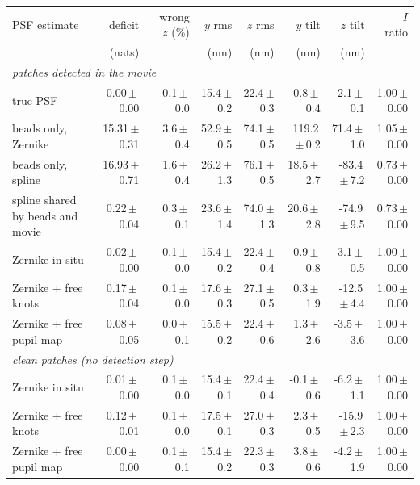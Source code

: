 \begin{tabular}{lrrrrrrr}\toprule
PSF estimate & deficit & wrong $z$ (\%) & $y$ rms & $z$ rms & $y$ tilt & $z$ tilt & $I$ ratio\\
 & (nats) & & (nm) & (nm) & (nm) & (nm) & \\ \midrule
\multicolumn{8}{l}{\emph{patches detected in the movie}}\\
true PSF & 0.00\,$\pm$\,0.00 & 0.1\,$\pm$\,0.0 & 15.4\,$\pm$\,0.2 & 22.4\,$\pm$\,0.3 & 0.8\,$\pm$\,0.4 & -2.1\,$\pm$\,0.1 & 1.00\,$\pm$\,0.00\\
beads only, Zernike & 15.31\,$\pm$\,0.31 & 3.6\,$\pm$\,0.4 & 52.9\,$\pm$\,0.5 & 74.1\,$\pm$\,0.5 & 119.2\,$\pm$\,0.2 & 71.4\,$\pm$\,1.0 & 1.05\,$\pm$\,0.00\\
beads only, spline & 16.93\,$\pm$\,0.71 & 1.6\,$\pm$\,0.4 & 26.2\,$\pm$\,1.3 & 76.1\,$\pm$\,0.5 & 18.5\,$\pm$\,2.7 & -83.4\,$\pm$\,7.2 & 0.73\,$\pm$\,0.00\\
spline shared by beads and movie & 0.22\,$\pm$\,0.04 & 0.3\,$\pm$\,0.1 & 23.6\,$\pm$\,1.4 & 74.0\,$\pm$\,1.3 & 20.6\,$\pm$\,2.8 & -74.9\,$\pm$\,9.5 & 0.73\,$\pm$\,0.00\\
Zernike in situ & 0.02\,$\pm$\,0.00 & 0.1\,$\pm$\,0.0 & 15.4\,$\pm$\,0.2 & 22.4\,$\pm$\,0.4 & -0.9\,$\pm$\,0.8 & -3.1\,$\pm$\,0.5 & 1.00\,$\pm$\,0.00\\
Zernike + free knots & 0.17\,$\pm$\,0.04 & 0.1\,$\pm$\,0.0 & 17.6\,$\pm$\,0.3 & 27.1\,$\pm$\,0.5 & 0.3\,$\pm$\,1.9 & -12.5\,$\pm$\,4.4 & 1.00\,$\pm$\,0.00\\
Zernike + free pupil map & 0.08\,$\pm$\,0.05 & 0.0\,$\pm$\,0.1 & 15.5\,$\pm$\,0.2 & 22.4\,$\pm$\,0.6 & 1.3\,$\pm$\,2.6 & -3.5\,$\pm$\,3.6 & 1.00\,$\pm$\,0.00\\
\multicolumn{8}{l}{\emph{clean patches (no detection step)}}\\
Zernike in situ & 0.01\,$\pm$\,0.00 & 0.1\,$\pm$\,0.0 & 15.4\,$\pm$\,0.1 & 22.4\,$\pm$\,0.4 & -0.1\,$\pm$\,0.6 & -6.2\,$\pm$\,1.1 & 1.00\,$\pm$\,0.00\\
Zernike + free knots & 0.12\,$\pm$\,0.01 & 0.1\,$\pm$\,0.0 & 17.5\,$\pm$\,0.1 & 27.0\,$\pm$\,0.3 & 2.3\,$\pm$\,0.5 & -15.9\,$\pm$\,2.3 & 1.00\,$\pm$\,0.00\\
Zernike + free pupil map & 0.00\,$\pm$\,0.00 & 0.1\,$\pm$\,0.1 & 15.4\,$\pm$\,0.2 & 22.3\,$\pm$\,0.3 & 3.8\,$\pm$\,0.6 & -4.2\,$\pm$\,1.9 & 1.00\,$\pm$\,0.00\\
\bottomrule\end{tabular}